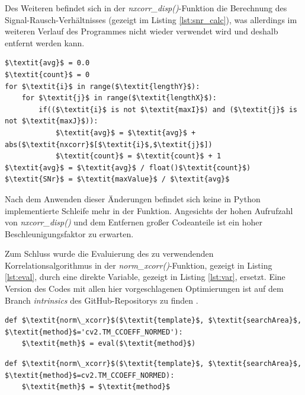 \begin{sloppypar}
	Des Weiteren befindet sich in der \textit{nxcorr\_disp()}-Funktion die Berechnung des Signal-Rausch-Verhältnisses (gezeigt im Listing \ref{lst:snr_calc}), was allerdings im weiteren Verlauf des Programmes nicht wieder verwendet wird und deshalb entfernt werden kann. 
\end{sloppypar}

\begin{lstlisting}[caption={Berechnung des Signal-Rausch-Verhältnisses}, label={lst:snr_calc}]
$\textit{avg}$ = 0.0
$\textit{count}$ = 0
for $\textit{i}$ in range($\textit{lengthY}$):
	for $\textit{j}$ in range($\textit{lengthX}$):
		if(($\textit{i}$ is not $\textit{maxI}$) and ($\textit{j}$ is not $\textit{maxJ}$)):
			$\textit{avg}$ = $\textit{avg}$ + abs($\textit{nxcorr}$[$\textit{i}$,$\textit{j}$])
			$\textit{count}$ = $\textit{count}$ + 1
$\textit{avg}$ = $\textit{avg}$ / float()$\textit{count}$)
$\textit{SNr}$ = $\textit{maxValue}$ / $\textit{avg}$
\end{lstlisting}

Nach dem Anwenden dieser Änderungen befindet sich keine in Python implementierte Schleife mehr in der Funktion. Angesichts der hohen Aufrufzahl von \textit{nxcorr\_disp()} und dem Entfernen großer Codeanteile ist ein hoher Beschleunigungsfaktor zu erwarten. 

Zum Schluss wurde die Evaluierung des zu verwendenden Korrelationsalgorithmus in der \textit{norm\_xcorr()}-Funktion, gezeigt in Listing \ref{lst:eval}, durch eine direkte Variable, gezeigt in Listing \ref{lst:var}, ersetzt. Eine Version des Codes mit allen hier vorgeschlagenen Optimierungen ist auf dem Branch \textit{intrinsics} des GitHub-Repositorys zu finden \cite{Coj17}. 

\begin{lstlisting}[caption={Evaluierung der Korellationsmethode}, label={lst:eval}]
def $\textit{norm\_xcorr}$($\textit{template}$, $\textit{searchArea}$, $\textit{method}$='cv2.TM_CCOEFF_NORMED'):
	$\textit{meth}$ = eval($\textit{method}$)
\end{lstlisting}

\begin{lstlisting}[caption={Übergabe der Korellationsmethode als Variable}, label={lst:var}]
def $\textit{norm\_xcorr}$($\textit{template}$, $\textit{searchArea}$, $\textit{method}$=cv2.TM_CCOEFF_NORMED):
	$\textit{meth}$ = $\textit{method}$
\end{lstlisting}

